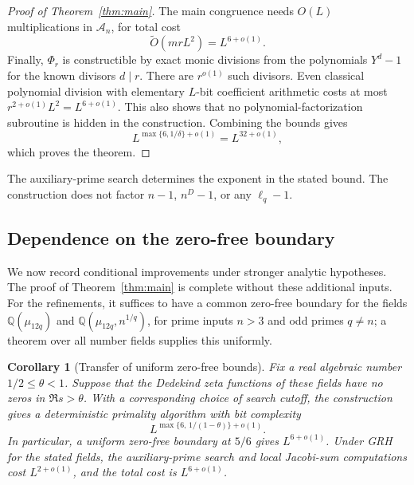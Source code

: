 \documentclass[11pt]{article}
\newtheorem{corollary}[theorem]{Corollary}
\theoremstyle{definition}
\theoremstyle{remark}
\newcommand{\Q}{\mathbb Q}
\newcommand{\softO}{\widetilde O}
\newcommand{\A}{\mathcal A}
\begin{document}
\begin{proof}[Proof of Theorem~\ref{thm:main}]
The main congruence needs $O(L)$ multiplications in $\A_n$, for
total cost
\[
 \softO(mrL^2)=L^{6+o(1)}.
\]
Finally, $\Phi_r$ is constructible by exact monic divisions from
the polynomials $Y^d-1$ for the known divisors $d\mid r$.
There are $r^{o(1)}$ such divisors. Even classical polynomial
division with elementary $L$-bit coefficient arithmetic costs
at most $r^{2+o(1)}L^2=L^{6+o(1)}$. This also shows that no
polynomial-factorization subroutine is hidden in the construction.
Combining the bounds gives
\[
 L^{\max\{6,1/\delta\}+o(1)}=L^{32+o(1)},
\]
which proves the theorem.
\end{proof}

The auxiliary-prime search determines the exponent in the stated
bound. The construction does not factor $n-1$, $n^D-1$, or any
$\ell_q-1$.

\subsection{Dependence on the zero-free boundary}
\label{sec:conditional-bounds}

We now record conditional improvements under stronger analytic
hypotheses. The proof of Theorem~\ref{thm:main} is complete without
these additional inputs. For the refinements, it suffices to have
a common zero-free
boundary for the fields $\Q(\mu_{12q})$ and
$\Q(\mu_{12q},n^{1/q})$, for prime inputs $n>3$ and odd primes
$q\ne n$; a theorem over all number fields supplies this uniformly.

\begin{corollary}[Transfer of uniform zero-free bounds]
\label{cor:analytic-complexity}
Fix a real algebraic number $1/2\le\theta<1$. Suppose that the
Dedekind zeta functions of these fields have no zeros in
$\Re s>\theta$. With a corresponding choice of search cutoff,
the construction gives a deterministic primality algorithm with
bit complexity
\begin{equation}\label{eq:general-complexity}
 L^{\max\{6,\,1/(1-\theta)\}+o(1)}.
\end{equation}
In particular, a uniform zero-free boundary at $5/6$
gives $L^{6+o(1)}$. Under GRH for the stated fields, the auxiliary-prime
search and local Jacobi-sum computations cost $L^{2+o(1)}$, and the total
cost is $L^{6+o(1)}$.
\end{corollary}
\end{document}
